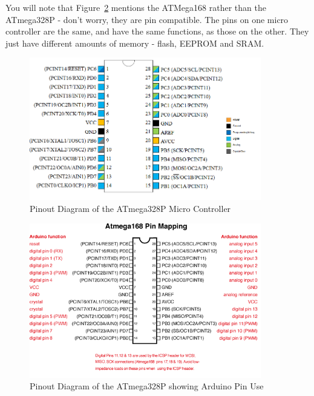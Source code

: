\begin{note}
	You will note that Figure~\ref{fig-arduino-uno-pinout} mentions the ATMega168 rather than the ATmega328P - don't worry, they are pin compatible. The pins on one micro controller are the same, and have the same functions, as those on the other. They just have different amounts of memory - flash, EEPROM and SRAM.
\end{note}	

\begin{figure}[p]
	\centering
	\includegraphics[width=0.9\textwidth]{Content/images/ATmega328P-pins}
	\caption{Pinout Diagram of the ATmega328P Micro Controller}
	\label{fig-atmega328p-pinout}
\end{figure}

\begin{figure}[p]
	\centering
	\includegraphics[width=0.9\textwidth]{Content/images/ArduinoUno-pins}
	\caption{Pinout Diagram of the ATmega328P showing Arduino Pin Use}
	\label{fig-arduino-uno-pinout}
\end{figure}

